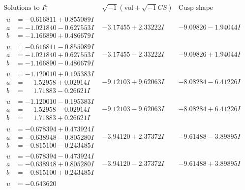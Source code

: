 \documentclass[1p]{elsarticle_modified}
\theoremstyle{definition}
\newcommand{\I}{\sqrt{-1}}
\begin{document}
$$\begin{array}{c|c|c}  
\text{Solutions to }I^u_{1}& \I (\text{vol} + \sqrt{-1}CS) & \text{Cusp shape}\\
 \hline 
\begin{aligned}
u &= -0.616811 + 0.855089 I \\
a &= -1.021840 - 0.627553 I \\
b &= -1.166890 + 0.486679 I\end{aligned}
 & -3.17455 + 2.33222 I & -9.09826 - 1.94044 I \\ \hline\begin{aligned}
u &= -0.616811 - 0.855089 I \\
a &= -1.021840 + 0.627553 I \\
b &= -1.166890 - 0.486679 I\end{aligned}
 & -3.17455 - 2.33222 I & -9.09826 + 1.94044 I \\ \hline\begin{aligned}
u &= -1.120010 + 0.195383 I \\
a &= \phantom{-}1.52958 + 0.02914 I \\
b &= \phantom{-}1.71883 - 0.26621 I\end{aligned}
 & -9.12103 + 9.62063 I & -8.08284 - 6.41226 I \\ \hline\begin{aligned}
u &= -1.120010 - 0.195383 I \\
a &= \phantom{-}1.52958 - 0.02914 I \\
b &= \phantom{-}1.71883 + 0.26621 I\end{aligned}
 & -9.12103 - 9.62063 I & -8.08284 + 6.41226 I \\ \hline\begin{aligned}
u &= -0.678394 + 0.473924 I \\
a &= -0.638948 - 0.805280 I \\
b &= -0.815100 - 0.243485 I\end{aligned}
 & -3.94120 + 2.37372 I & -9.61488 - 3.89895 I \\ \hline\begin{aligned}
u &= -0.678394 - 0.473924 I \\
a &= -0.638948 + 0.805280 I \\
b &= -0.815100 + 0.243485 I\end{aligned}
 & -3.94120 - 2.37372 I & -9.61488 + 3.89895 I \\ \hline\begin{aligned}
u &= -0.643620\phantom{ +0.000000I} \\

\end{aligned}
\end{array}$$
\end{document}
